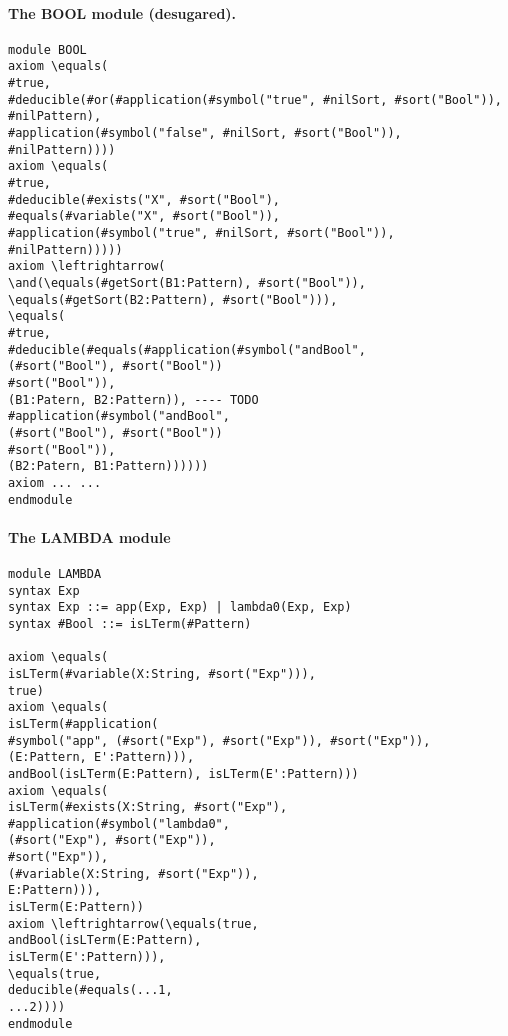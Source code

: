 \documentclass[UTF8,11pt]{article}
\theoremstyle{plain}
\theoremstyle{definition}
\theoremstyle{remark}
\begin{document}
\paragraph{The {\small BOOL} module (desugared).}\quad
\begin{Verbatim}[fontsize=\small]
module BOOL
axiom \equals(
#true,
#deducible(#or(#application(#symbol("true", #nilSort, #sort("Bool")),
#nilPattern), 
#application(#symbol("false", #nilSort, #sort("Bool")),
#nilPattern))))
axiom \equals(
#true,
#deducible(#exists("X", #sort("Bool"), 
#equals(#variable("X", #sort("Bool")), 
#application(#symbol("true", #nilSort, #sort("Bool")),
#nilPattern)))))
axiom \leftrightarrow(
\and(\equals(#getSort(B1:Pattern), #sort("Bool")), 
\equals(#getSort(B2:Pattern), #sort("Bool"))),
\equals(
#true,
#deducible(#equals(#application(#symbol("andBool", 
(#sort("Bool"), #sort("Bool"))
#sort("Bool")), 
(B1:Patern, B2:Pattern)), ---- TODO
#application(#symbol("andBool", 
(#sort("Bool"), #sort("Bool"))
#sort("Bool")), 
(B2:Patern, B1:Pattern))))))
axiom ... ...
endmodule
\end{Verbatim}

\paragraph{The {\small LAMBDA} module}\quad
\begin{Verbatim}[fontsize=\small]
module LAMBDA
syntax Exp
syntax Exp ::= app(Exp, Exp) | lambda0(Exp, Exp)
syntax #Bool ::= isLTerm(#Pattern)

axiom \equals(
isLTerm(#variable(X:String, #sort("Exp"))), 
true)
axiom \equals(
isLTerm(#application(
#symbol("app", (#sort("Exp"), #sort("Exp")), #sort("Exp")),
(E:Pattern, E':Pattern))),
andBool(isLTerm(E:Pattern), isLTerm(E':Pattern)))
axiom \equals(
isLTerm(#exists(X:String, #sort("Exp"),
#application(#symbol("lambda0",
(#sort("Exp"), #sort("Exp")),
#sort("Exp")),
(#variable(X:String, #sort("Exp")),
E:Pattern))),
isLTerm(E:Pattern))
axiom \leftrightarrow(\equals(true, 
andBool(isLTerm(E:Pattern), 
isLTerm(E':Pattern))),
\equals(true,
deducible(#equals(...1,
...2)))) 
endmodule
\end{Verbatim}
\end{document}
